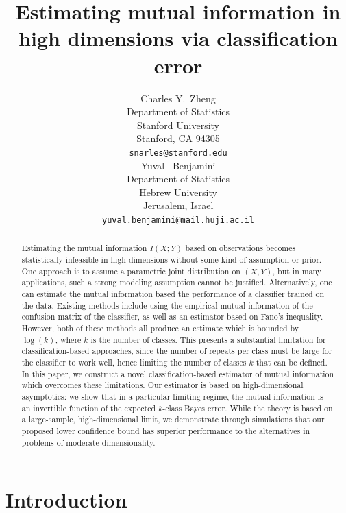 \documentclass{article}
\title{Estimating mutual information in high dimensions via classification error}
\author{
  Charles Y.~Zheng \\
  Department of Statistics\\
  Stanford University\\
  Stanford, CA 94305 \\
  \texttt{snarles@stanford.edu} \\
  \And
  Yuval ~Benjamini \\
  Department of Statistics \\
  Hebrew University\\
  Jerusalem, Israel\\
  \texttt{yuval.benjamini@mail.huji.ac.il}
}
\begin{document}

\maketitle

\begin{abstract}
Estimating the mutual information $I(X; Y)$ based on observations
becomes statistically infeasible in high dimensions without some kind
of assumption or prior.  One approach is to assume a parametric joint
distribution on $(X, Y)$, but in many applications, such a strong
modeling assumption cannot be justified.  Alternatively, one can estimate the mutual information based the performance of a classifier trained on the data.  Existing methods include using the empirical mutual information of the confusion matrix of the classifier, as
well as an estimator based on Fano's inequality.  However, both of these
methods all produce an estimate which is bounded by $\log(k)$,
where $k$ is the number of classes.
This presents a substantial limitation for classification-based approaches, since the number of
repeats per class must be large for the classifier to work well, hence limiting the number of classes $k$ that can be defined. In this paper, we construct a novel classification-based estimator of mutual information which
overcomes these limitations.  Our estimator is based on
high-dimensional asymptotics: we show that in a particular limiting
regime, the mutual information is an invertible function of the
expected $k$-class Bayes error.  While the theory is based
on a large-sample, high-dimensional limit, we demonstrate through
simulations that our proposed lower confidence bound has superior
performance to the alternatives in problems of moderate
dimensionality.
\end{abstract}

\section{Introduction}
\end{document}
